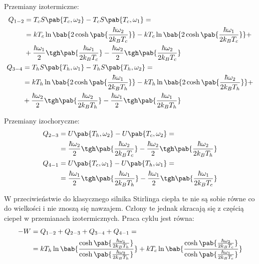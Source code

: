 Przemiany izotermiczne:
\begin{gather}
\begin{split}
	Q_{1-2} &= T_c S\pab{T_c,\omega_2} - T_c S\pab{T_c,\omega_1} = \\ &=
	kT_c \ln\bab{2\cosh\pab{\frac{\hbar\omega_2}{2k_B T_c}}} -
	kT_c \ln\bab{2\cosh\pab{\frac{\hbar\omega_1}{2k_B T_c}}} + \\ &+
	\frac{\hbar\omega_1}{2} \tgh\pab{\frac{\hbar\omega_1}{2k_B T_c}} -
	\frac{\hbar\omega_2}{2} \tgh\pab{\frac{\hbar\omega_2}{2k_B T_c}}
\end{split} \\
\begin{split}
	Q_{3-4} &= T_h S\pab{T_h,\omega_1} - T_h S\pab{T_h,\omega_2} = \\ &=
	kT_h \ln\bab{2\cosh\pab{\frac{\hbar\omega_1}{2k_B T_h}}} -
	kT_h \ln\bab{2\cosh\pab{\frac{\hbar\omega_2}{2k_B T_h}}} + \\ &+
	\frac{\hbar\omega_2}{2} \tgh\pab{\frac{\hbar\omega_2}{2k_B T_h}} -
	\frac{\hbar\omega_1}{2} \tgh\pab{\frac{\hbar\omega_1}{2k_B T_h}}
\end{split}
\end{gather}

Przemiany izochoryczne:
\begin{gather}
\begin{split}
	Q_{2-3} &= U\pab{T_h,\omega_2} - U\pab{T_c,\omega_2} = \\ &=
	\frac{\hbar\omega_2}{2}\tgh\pab{\frac{\hbar\omega_2}{2k_B T_c}} -
	\frac{\hbar\omega_2}{2}\tgh\pab{\frac{\hbar\omega_2}{2k_B T_h}}
\end{split} \\
\begin{split}
	Q_{4-1} &= U\pab{T_c,\omega_1} - U\pab{T_h,\omega_1} = \\ &=
	\frac{\hbar\omega_1}{2}\tgh\pab{\frac{\hbar\omega_1}{2k_B T_h}} -
	\frac{\hbar\omega_1}{2}\tgh\pab{\frac{\hbar\omega_1}{2k_B T_c}}
\end{split}
\end{gather}

W przeciwieństwie do klasycznego silnika Stirlinga ciepła te nie są sobie równe co do wielkości i nie znoszą się nawzajem. Człony te jednak skracają się z częścią ciepeł w przemianach izotermicznych. Praca cyklu jest równa:
\begin{equation}
\begin{split}
	-W &= Q_{1-2} + Q_{2-3} + Q_{3-4} + Q_{4-1} = \\ &=
	kT_h \ln\bab{\frac{
	\cosh\pab{\frac{\hbar\omega_1}{2k_B T_h}}
	}{
	\cosh\pab{\frac{\hbar\omega_2}{2k_B T_h}}
	}} +
	kT_c \ln\bab{\frac{
	\cosh\pab{\frac{\hbar\omega_2}{2k_B T_c}}
	}{
	\cosh\pab{\frac{\hbar\omega_1}{2k_B T_c}}
	}}
\end{split}
\end{equation}

